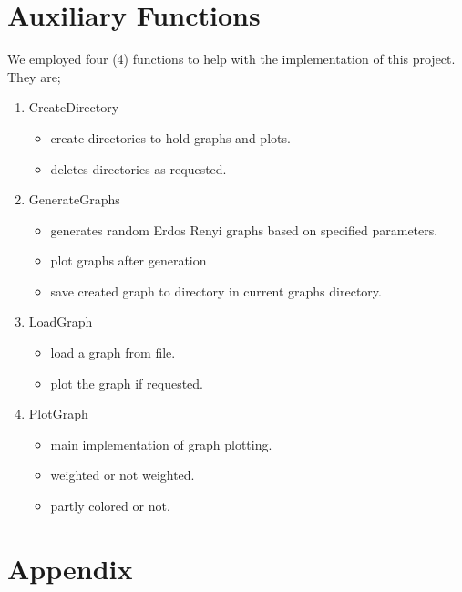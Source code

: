 \documentclass[longpaper, english, final, times]{revdetua}
\begin{document}
	\section{Auxiliary Functions}
		We employed four (4) functions to help with the implementation of this project. They are;
		\begin{enumerate}[label=\arabic*)]
			\item CreateDirectory
				\begin{itemize}
					\item create directories to hold graphs and plots.
					\item deletes directories as requested.
				\end{itemize}
			\item GenerateGraphs
				\begin{itemize}
					\item generates random Erdos Renyi graphs based on specified parameters. 
					\item plot graphs after generation
					\item save created graph to directory in current graphs directory.
				\end{itemize}
			\item LoadGraph
				\begin{itemize}
					\item load a graph from file.
					\item plot the graph if requested.
				\end{itemize}
			\item PlotGraph
				\begin{itemize}
					\item main implementation of graph plotting.
					\item weighted or not weighted.
					\item partly colored or not.
				\end{itemize}
		\end{enumerate}
	
	\section{\label{outline:appendix} Appendix}
		
%	 
	
\end{document}
